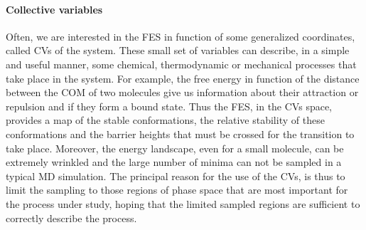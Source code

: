 \paragraph{\textbf{Collective variables}} Often, we are interested in the \ac{FES} in function of some
generalized coordinates, called \acp{CV} of the system. These small set of variables can describe, in a simple
and useful manner, some chemical, thermodynamic or mechanical processes that take place in the system. For
example, the free energy in function of the distance between the \ac{COM} of two molecules give us information
about their attraction or repulsion and if they form a bound state. Thus the \ac{FES}, in the \acp{CV} space,
provides a map of the stable conformations, the relative stability of these conformations and the barrier heights
that must be crossed for the transition to take place. Moreover, the energy landscape, even for a small molecule,
can be extremely wrinkled and the large number of minima can not be sampled in a typical \ac{MD} simulation. The
principal reason for the use of the \acp{CV}, is thus to limit the sampling to those regions of phase space that
are most important for the process under study, hoping that the limited sampled regions are sufficient to
correctly describe the process.


